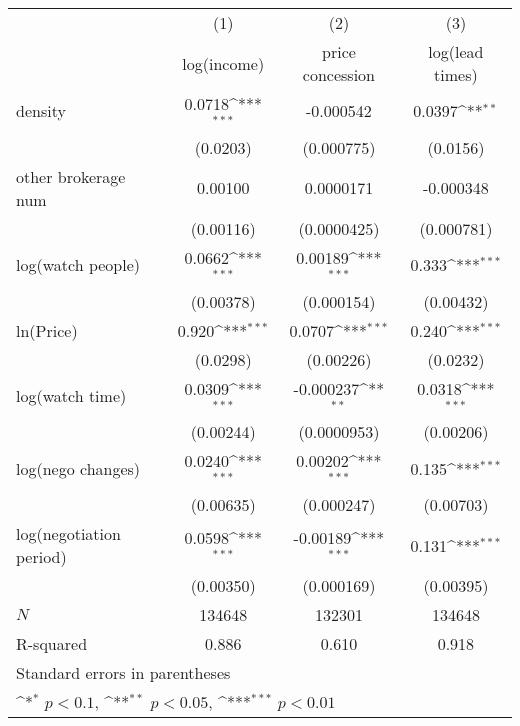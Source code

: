 {
\def\sym#1{\ifmmode^{#1}\else\(^{#1}\)\fi}
\begin{tabular}{l*{3}{c}}
\toprule
            &\multicolumn{1}{c}{(1)}&\multicolumn{1}{c}{(2)}&\multicolumn{1}{c}{(3)}\\
            &\multicolumn{1}{c}{log(income)}&\multicolumn{1}{c}{price concession}&\multicolumn{1}{c}{log(lead times)}\\
\midrule
density     &      0.0718\sym{***}&   -0.000542         &      0.0397\sym{**} \\
            &    (0.0203)         &  (0.000775)         &    (0.0156)         \\
\addlinespace
other brokerage num  &     0.00100         &   0.0000171         &   -0.000348         \\
            &   (0.00116)         & (0.0000425)         &  (0.000781)         \\
\addlinespace
log(watch people)&      0.0662\sym{***}&     0.00189\sym{***}&       0.333\sym{***}\\
            &   (0.00378)         &  (0.000154)         &   (0.00432)         \\
\addlinespace
ln(Price)&       0.920\sym{***}&      0.0707\sym{***}&       0.240\sym{***}\\
            &    (0.0298)         &   (0.00226)         &    (0.0232)         \\
\addlinespace
log(watch time)&      0.0309\sym{***}&   -0.000237\sym{**} &      0.0318\sym{***}\\
            &   (0.00244)         & (0.0000953)         &   (0.00206)         \\
\addlinespace
log(nego changes)&      0.0240\sym{***}&     0.00202\sym{***}&       0.135\sym{***}\\
            &   (0.00635)         &  (0.000247)         &   (0.00703)         \\
\addlinespace
log(negotiation period)&      0.0598\sym{***}&    -0.00189\sym{***}&       0.131\sym{***}\\
            &   (0.00350)         &  (0.000169)         &   (0.00395)         \\
\midrule
\(N\)       &      134648         &      132301         &      134648         \\
R-squared   &       0.886         &       0.610         &       0.918         \\
\bottomrule
\multicolumn{4}{l}{\footnotesize Standard errors in parentheses}\\
\multicolumn{4}{l}{\footnotesize \sym{*} \(p<0.1\), \sym{**} \(p<0.05\), \sym{***} \(p<0.01\)}\\
\end{tabular}
}
